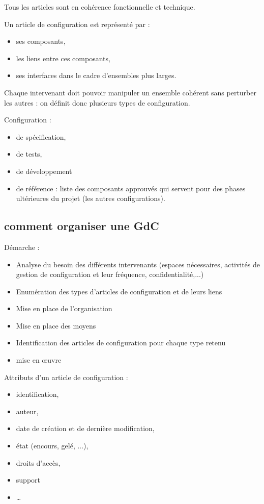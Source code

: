 Tous les articles sont en cohérence fonctionnelle et technique.

Un article de configuration est représenté par :

\begin{itemize}
	\item ses composants,
	\item les liens entre ces composants,
	\item ses interfaces dans le cadre d’ensembles plus larges.
\end{itemize}

Chaque intervenant doit pouvoir manipuler un ensemble cohérent sans perturber les autres : on définit donc plusieurs types de configuration.

Configuration :

\begin{itemize}
	\item de spécification,
	\item de tests,
	\item de développement
	\item de référence : liste des composants approuvés qui servent pour des phases ultérieures du projet (les autres configurations).
\end{itemize}

	\subsection{comment organiser une GdC}

Démarche :

	\begin{itemize}
	\item Analyse du besoin des différents intervenants (espaces nécessaires, activités de gestion de configuration et leur fréquence, confidentialité,...)
	\item Enumération des types d’articles de configuration et de leurs liens
	\item Mise en place de l’organisation
	\item Mise en place des moyens
	\item Identification des articles de configuration pour chaque type retenu
	\item mise en \oe{}uvre
	\end{itemize}

Attributs d’un article de configuration :

\begin{itemize}
	\item identification,
	\item auteur,
	\item date de création et de dernière modification,
	\item état (encours, gelé, ...),
	\item droits d’accès,
	\item support
	\item \ldots
\end{itemize}

